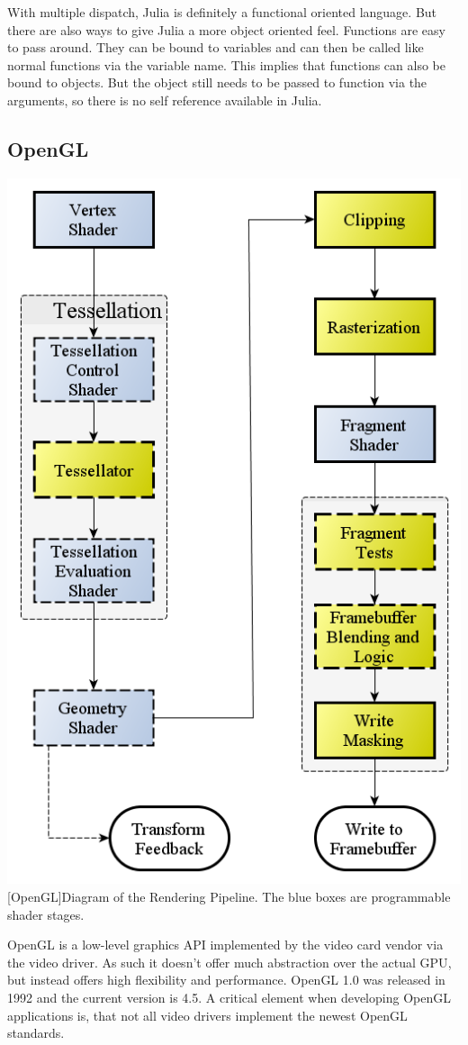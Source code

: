 With multiple dispatch, Julia is definitely a functional oriented language. But there are also ways to give Julia a more object oriented feel.
Functions are easy to pass around. They can be bound to variables and can then be called like normal functions via the variable name. This implies that functions can also be bound to objects. 
But the object still needs to be passed to function via the arguments, so there is no self reference available in Julia.



\subsection{\ac{OpenGL}}

\vspace{1em}
\begin{minipage}{\linewidth}
    \centering
    \includegraphics[width=0.5\linewidth]{graphics/RenderingPipeline.png}
    [OpenGL]{Diagram of the Rendering Pipeline. The blue boxes are programmable shader stages. \cite{OpenGLPipeline}}
    \label{fig:opengl}
\end{minipage}


\ac{OpenGL} is a low-level graphics API implemented by the video card vendor via the video driver. 
As such it doesn't offer much abstraction over the actual \ac{GPU}, but instead offers high flexibility and performance.
\ac{OpenGL} 1.0 was released in 1992 and the current version is 4.5.
A critical element when developing \ac{OpenGL} applications is, that not all video drivers implement the newest \ac{OpenGL} standards.


